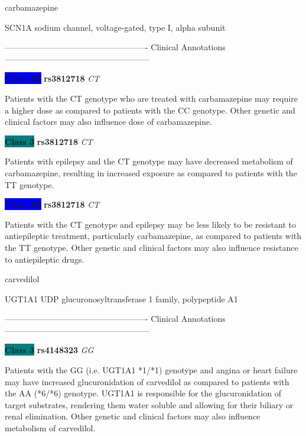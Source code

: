 \documentclass{resume} %
\begin{document}
\begin{rSection}{ carbamazepine }
\begin{rSubsection}{ SCN1A }{ sodium channel, voltage-gated, type I, alpha subunit }{}{}
\item[] ---------------------------------------------------- Clinical Annotations -----------------------------------------------------\newline
\item \textbf{\colorbox{blue} {Class 2B}} \textbf{ rs3812718 } \textit{ CT }
\item[] Patients with the CT genotype who are treated with carbamazepine may require a higher dose as compared to patients with the CC genotype. Other genetic and clinical factors may also influence dose of carbamazepine.\item \textbf{\colorbox{teal} {Class 3}} \textbf{ rs3812718 } \textit{ CT }
\item[] Patients with epilepsy and the CT genotype may have decreased metabolism of carbamazepine, resulting in increased exposure as compared to patients with the TT genotype. \item \textbf{\colorbox{blue} {Class 2B}} \textbf{ rs3812718 } \textit{ CT }
\item[] Patients with the CT genotype and epilepsy may be less likely to be resistant to antiepileptic treatment, particularly carbamazepine, as compared to patients with the TT genotype. Other genetic and clinical factors may also influence resistance to antiepileptic drugs.
\end{rSubsection}

\end{rSection}\begin{rSection}{ carvedilol }
\item[]

\begin{rSubsection}{ UGT1A1 }{ UDP glucuronosyltransferase 1 family, polypeptide A1 }{}{}
\item[]

\item[] ---------------------------------------------------- Clinical Annotations -----------------------------------------------------\newline
\item \textbf{\colorbox{teal} {Class 3}} \textbf{ rs4148323 } \textit{ GG }
\item[] Patients with the GG (i.e. UGT1A1 *1/*1) genotype and angina or heart failure may have increased glucuronidation of carvedilol as compared to patients with the AA (*6/*6) genotype. UGT1A1 is responsible for the glucuronidation of target substrates, rendering them water soluble and allowing for their biliary or renal elimination. Other genetic and clinical factors may also influence metabolism of carvedilol.
\end{rSubsection}


\end{rSection}
\end{document}
